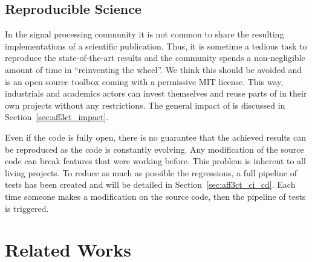\subsection{Reproducible Science}

In the signal processing community it is not common to share the resulting
implementations of a scientific publication. Thus, it is sometime a tedious task
to reproduce the state-of-the-art results and the community spends a
non-negligible amount of time in ``reinventing the wheel''. We think this should
be avoided and \AFFECT is an open source toolbox coming with a permissive MIT
license. This way, industrials and academics actors can invest themselves and
reuse parts of \AFFECT in their own projects without any restrictions. The
general impact of \AFFECT is discussed in Section~\ref{sec:aff3ct_impact}.

Even if the code is fully open, there is no guarantee that the achieved results
can be reproduced as the code is constantly evolving. Any modification of the
source code can break features that were working before. This problem is
inherent to all living projects. To reduce as much as possible the regressions,
a full pipeline of tests has been created and will be detailed in
Section~\ref{sec:aff3ct_ci_cd}. Each time someone makes a modification on the
\AFFECT source code, then the pipeline of tests is triggered.

\section{Related Works}
\label{sec:aff3ct_related_works}

